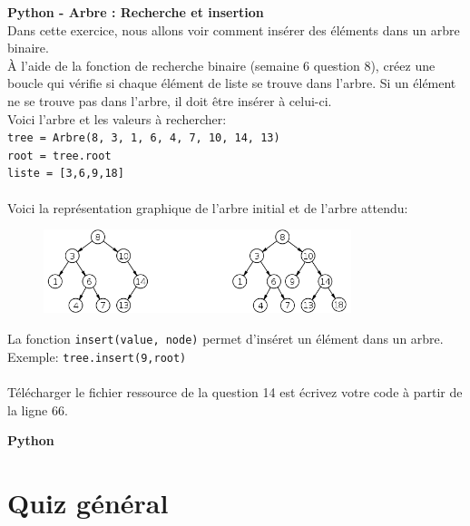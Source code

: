 \begin{Exercice}[5 minutes] \textbf{Python - Arbre : Recherche et insertion}\\

Dans cette exercice, nous allons voir comment insérer des éléments dans un arbre binaire.\\

À l'aide de la fonction de recherche binaire (semaine 6 question 8), créez une boucle qui vérifie si chaque élément de liste se trouve dans l'arbre. Si un élément ne se trouve pas dans l'arbre, il doit être insérer à celui-ci. \\

Voici l'arbre et les valeurs à rechercher:\\
\lstinline{tree = Arbre(8, 3, 1, 6, 4, 7, 10, 14, 13)}\\
\lstinline{root = tree.root}\\
\lstinline{liste = [3,6,9,18]}\\\\
Voici la représentation graphique de l'arbre initial et de l'arbre attendu: 
\begin{figure}[h]
    \centering
    \includegraphics[width=0.80\textwidth]{img/binary-tree.png}
\end{figure}

\begin{conseil}
    La fonction \lstinline{insert(value, node)} permet d'inséret un élément dans un arbre. Exemple: \lstinline{tree.insert(9,root)}\\\\
    Télécharger le fichier ressource de la question 14 est écrivez votre code à partir de la ligne 66. 
\end{conseil}

\begin{solution}
    \textbf{Python} \\

     
\end{solution}

\end{Exercice}

\section{Quiz général}

